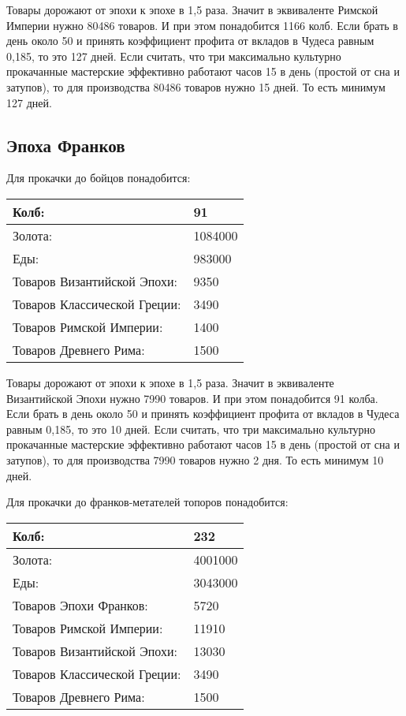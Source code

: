 Товары дорожают от эпохи к эпохе в 1,5 раза.
Значит в эквиваленте Римской Империи нужно 80486 товаров.
И при этом понадобится 1166 колб. Если брать в день около 50 и принять коэффициент профита от вкладов
в Чудеса равным 0,185, то это 127 дней.
Если считать, что три максимально культурно прокачанные мастерские эффективно работают часов 15 в день (простой от сна и затупов),
то для производства 80486 товаров нужно 15 дней.
То есть минимум 127 дней.



\subsection{Эпоха Франков}

Для прокачки до бойцов понадобится:

\begin{center}
    \begin{tabular}[h!]{|l|l|}
        \hline
        Колб:   & 91 \\\hline
        Золота: & 1084000 \\\hline
        Еды:    & 983000 \\\hline
        Товаров Византийской Эпохи: & 9350 \\\hline
        Товаров Классической Греции: & 3490 \\\hline
        Товаров Римской Империи: & 1400 \\\hline
        Товаров Древнего Рима: & 1500 \\\hline
    \end{tabular}
\end{center}

Товары дорожают от эпохи к эпохе в 1,5 раза.
Значит в эквиваленте Византийской Эпохи нужно 7990 товаров.
И при этом понадобится 91 колба. Если брать в день около 50 и принять коэффициент профита от вкладов
в Чудеса равным 0,185, то это 10 дней.
Если считать, что три максимально культурно прокачанные мастерские эффективно работают часов 15 в день (простой от сна и затупов),
то для производства 7990 товаров нужно 2 дня.
То есть минимум 10 дней.


Для прокачки до франков-метателей топоров понадобится:

\begin{center}
    \begin{tabular}[h!]{|l|l|}
        \hline
        Колб:   & 232 \\\hline
        Золота: & 4001000 \\\hline
        Еды:    & 3043000 \\\hline
        Товаров Эпохи Франков: & 5720 \\\hline
        Товаров Римской Империи: & 11910 \\\hline
        Товаров Византийской Эпохи: & 13030 \\\hline
        Товаров Классической Греции: & 3490 \\\hline
        Товаров Древнего Рима: & 1500 \\\hline
    \end{tabular}
\end{center}

